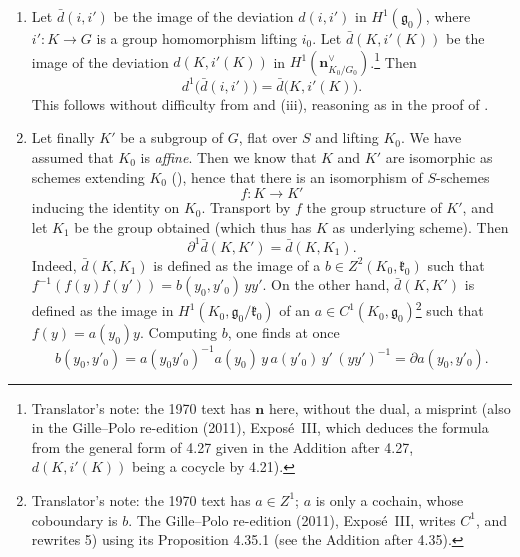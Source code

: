 \begin{enumerate}
\item[4)]
Let \(\bar d(i,i')\) be the image of the deviation \(d(i,i')\) in
\(H^1(\mathfrak g_0)\), where \(i':K\to G\) is a group homomorphism
lifting \(i_0\). Let \(\bar d(K,i'(K))\) be the image of the deviation
\(d(K,i'(K))\) in \(H^1(\mathbf n^{\vee}_{K_0/G_0})\).\footnote{Translator's note:
the 1970 text has \(\mathbf n\) here, without the dual, a misprint (also in
the Gille--Polo re-edition (2011), Exposé~III, which deduces the formula from
the general form of 4.27 given in the Addition after 4.27, \(d(K,i'(K))\)
being a cocycle by 4.21).} Then
\[
 d^1\bigl(\bar d(i,i')\bigr)=\bar d\bigl(K,i'(K)\bigr).
\]
This follows without difficulty from  and (iii), reasoning as in the
proof of .

\item[5)]
Let finally \(K'\) be a subgroup of \(G\), flat over \(S\) and lifting
\(K_0\). We have assumed that \(K_0\) is \emph{affine}. Then we know that
\(K\) and \(K'\) are isomorphic as schemes extending \(K_0\)
(), hence that there is an isomorphism of \(S\)-schemes
\[
 f:K\longrightarrow K'
\]
inducing the identity on \(K_0\). Transport by \(f\) the group structure
of \(K'\), and let \(K_1\) be the group obtained (which thus has \(K\) as
underlying scheme). Then
\[
 \partial^1\bar d(K,K')=\bar d(K,K_1).
\]
Indeed, \(\bar d(K,K_1)\) is defined as the image of a
\(b\in Z^2(K_0,\mathfrak k_0)\) such that
\(f^{-1}(f(y)f(y'))=b(y_0,y'_0)\,yy'\). On the other hand,
\(\bar d(K,K')\) is defined as the image in
\(H^1(K_0,\mathfrak g_0/\mathfrak k_0)\) of an
\(a\in C^1(K_0,\mathfrak g_0)\)\footnote{Translator's note: the 1970 text has
\(a\in Z^1\); \(a\) is only a cochain, whose coboundary is \(b\). The
Gille--Polo re-edition (2011), Exposé~III, writes \(C^1\), and rewrites 5)
using its Proposition 4.35.1 (see the Addition after 4.35).} such that \(f(y)=a(y_0)y\). Computing \(b\),
one finds at once
\[
 b(y_0,y'_0)=a(y_0y'_0)^{-1}a(y_0)\,y\,a(y'_0)\,y'\,(yy')^{-1}
 =\partial a(y_0,y'_0).
\]
\end{enumerate}
